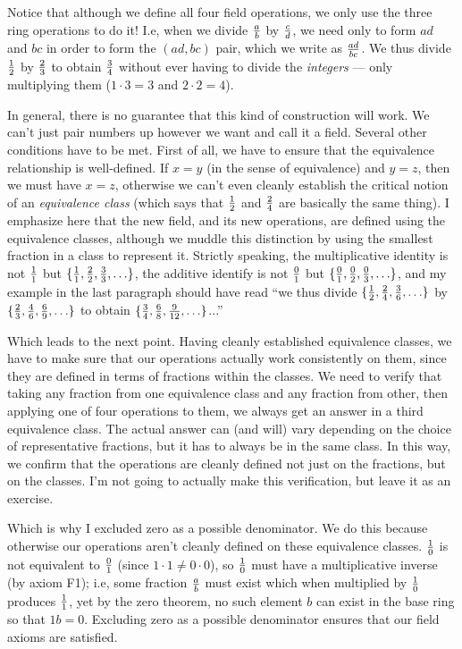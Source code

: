 Notice that although we define all four field operations, we only
use the three ring operations to do it!  I.e, when we divide
$a\over b$ by $c\over d$, we need only to form $ad$ and $bc$
in order to form the $(ad,bc)$ pair, which we write as ${ad}\over{bc}$.
We thus divide $1\over2$ by $2\over3$ to obtain $3\over4$
without ever having to divide the {\it integers} ---
only multiplying them ($1\cdot3=3$ and $2\cdot2=4$).

In general, there is no guarantee that this kind of construction will
work.  We can't just pair numbers up however we want and call it a
field.  Several other conditions have to be met.  First of all, we
have to ensure that the equivalence relationship is well-defined.  If
$x=y$ (in the sense of equivalence) and $y=z$, then we must have
$x=z$, otherwise we can't even cleanly establish the critical notion
of an {\it equivalence class} (which says that $1\over2$ and $2\over4$
are basically the same thing).  I emphasize here that the new field,
and its new operations, are defined using the equivalence classes,
although we muddle this distinction by using the smallest fraction in
a class to represent it.  Strictly speaking, the multiplicative
identity is not ${1\over1}$ but
$\{{1\over1},{2\over2},{3\over3},\ldots\}$, the additive identify is
not ${0\over1}$ but $\{{0\over1},{0\over2},{0\over3},\ldots\}$, and my
example in the last paragraph should have read ``we thus divide
$\{{1\over2},{2\over4},{3\over6},\ldots\}$ by
$\{{2\over3},{4\over6},{6\over9},\ldots\}$ to obtain
$\{{3\over4},{6\over8},{9\over12},\ldots\}$...''

Which leads to the next point.  Having cleanly established equivalence
classes, we have to make sure that our operations actually work
consistently on them, since they are defined in terms of fractions
within the classes.  We need to verify that taking any fraction from
one equivalence class and any fraction from other, then applying one
of four operations to them, we always get an answer in a third
equivalence class.  The actual answer can (and will) vary depending on
the choice of representative fractions, but it has to always be in the
same class.  In this way, we confirm that the operations are cleanly
defined not just on the fractions, but on the classes.  I'm not going
to actually make this verification, but leave it as an exercise.

Which is why I excluded zero as a possible denominator.  We do this
because otherwise our operations aren't cleanly defined on these
equivalence classes. ${1\over0}$ is not equivalent to ${0\over1}$
(since $1\cdot1\ne0\cdot0$), so ${1\over0}$ must have a multiplicative
inverse (by axiom F1); i.e, some fraction ${a\over b}$ must exist
which when multiplied by ${1\over0}$ produces ${1\over1}$, yet by the
zero theorem, no such element $b$ can exist in the base ring so that
$1b=0$.  Excluding zero as a possible denominator ensures that our
field axioms are satisfied.

